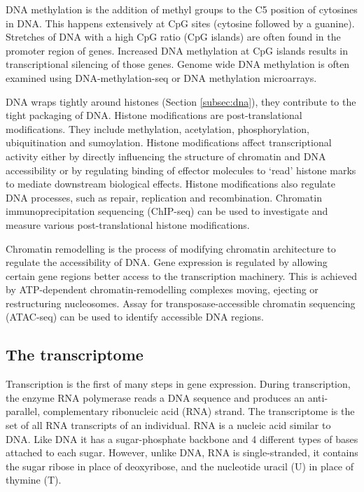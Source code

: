 DNA methylation is the addition of methyl groups to the C5 position of cytosines in DNA.
This happens extensively at CpG sites (cytosine followed by a guanine).
Stretches of DNA with a high CpG ratio (CpG islands) are often found in the promoter region of genes.
Increased DNA methylation at CpG islands results in transcriptional silencing of those genes.
Genome wide DNA methylation is often examined using DNA-methylation-seq or DNA methylation microarrays.

DNA wraps tightly around histones (Section \ref{subsec:dna}), they contribute to the tight packaging of DNA.
Histone modifications are post-translational modifications.
They include methylation, acetylation, phosphorylation, ubiquitination and sumoylation.
Histone modifications affect transcriptional activity either by directly influencing the structure of chromatin and DNA accessibility or by regulating binding of effector molecules to `read' histone marks to mediate downstream biological effects.
Histone modifications also regulate DNA processes, such as repair, replication and recombination\cite{bannister2011regulation}.
Chromatin immunoprecipitation sequencing (ChIP-seq) can be used to investigate and measure various post-translational histone modifications.

Chromatin remodelling is the process of modifying chromatin architecture to regulate the accessibility of DNA.
Gene expression is regulated by allowing certain gene regions better access to the transcription machinery.
This is achieved by ATP-dependent chromatin-remodelling complexes moving, ejecting or restructuring nucleosomes.
Assay for transposase-accessible chromatin sequencing (ATAC-seq) can be used to identify accessible DNA regions.


\subsection{The transcriptome}
Transcription is the first of many steps in gene expression.
During transcription, the enzyme RNA polymerase reads a DNA sequence and produces an anti-parallel, complementary ribonucleic acid (RNA) strand.
The transcriptome is the set of all RNA transcripts of an individual.
RNA is a nucleic acid similar to DNA. Like DNA it has a sugar-phosphate backbone and 4 different types of bases attached to each sugar.
However, unlike DNA, RNA is single-stranded, it contains the sugar ribose in place of deoxyribose, and the nucleotide uracil (U) in place of thymine (T).

